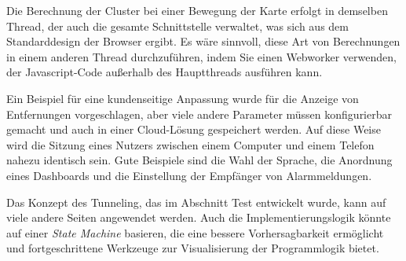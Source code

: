 Die Berechnung der Cluster bei einer Bewegung der Karte erfolgt in demselben Thread, der auch die gesamte Schnittstelle verwaltet, was sich aus dem Standarddesign der Browser ergibt.
Es wäre sinnvoll, diese Art von Berechnungen in einem anderen Thread durchzuführen, indem Sie einen Webworker verwenden, der Javascript-Code außerhalb des Hauptthreads ausführen kann.

Ein Beispiel für eine kundenseitige Anpassung wurde für die Anzeige von Entfernungen vorgeschlagen, aber viele andere Parameter müssen konfigurierbar gemacht und auch in einer Cloud-Lösung gespeichert werden.
Auf diese Weise wird die Sitzung eines Nutzers zwischen einem Computer und einem Telefon nahezu identisch sein.
Gute Beispiele sind die Wahl der Sprache, die Anordnung eines Dashboards und die Einstellung der Empfänger von Alarmmeldungen.

Das Konzept des Tunneling, das im Abschnitt Test entwickelt wurde, kann auf viele andere Seiten angewendet werden.
Auch die Implementierungslogik könnte auf einer \textit{State Machine} basieren, die eine bessere Vorhersagbarkeit ermöglicht und fortgeschrittene Werkzeuge zur Visualisierung der Programmlogik bietet.
